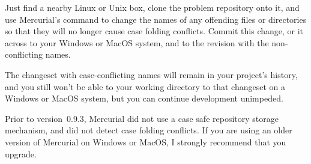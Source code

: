 Just find a nearby Linux or Unix box, clone the problem repository
onto it, and use Mercurial's  command to change the
names of any offending files or directories so that they will no
longer cause case folding conflicts.  Commit this change, 
or  it across to your Windows or MacOS system, and
 to the revision with the non-conflicting names.

The changeset with case-conflicting names will remain in your
project's history, and you still won't be able to  your
working directory to that changeset on a Windows or MacOS system, but
you can continue development unimpeded.

\begin{note}
  Prior to version~0.9.3, Mercurial did not use a case safe repository
  storage mechanism, and did not detect case folding conflicts.  If
  you are using an older version of Mercurial on Windows or MacOS, I
  strongly recommend that you upgrade.
\end{note}


